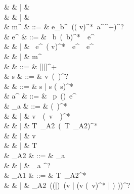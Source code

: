 \documentclass[a4paper]{article}
\begin{document}
{\begin{grammar}
                                    &              & |   & \varepsilon\ \code{\&\&}\ \varepsilon \\
                                    &              & |   & \varepsilon\ \code{||}\ \varepsilon \\
           & m^{}  & ::= & {e_b}^{}\ ((\code{!} v)^*\ {a^{}}^+)^? \\
                   & e^{}  & ::= & \ b\ (\ b)^*\ \ e^{}\\
                                    &              & |   & \ e^{}\ (\code{!} v)^*\ \ e^{}\ \ e^{} \\
                                    &              & |   & m^{} \\
                         & \kappa       & ::= & [||]^+ \\
               & s            & ::= & v\ (\code{:<}\ \kappa)^? \\
              &  & ::= & s | \code{(} s (\code{,}\ s)^*\code{)} \\
                  & a^{}  & ::= & \code{|}\ p\ (\code{=>|->|\textasciitilde>})\ e^{} \\
                     & \tau_a       & ::= & \code{(} \tau (\code{,}\ \tau)^* \code{)} \\
                                    &              & |   & \code{\{} v\ \code{:}\ \tau (\code{,}\ v\ \code{:}\ \tau)^* \code{\}} \\
                                    &              & |   & \code{<} T\ \tau_{A2}\ (\code{|}\ T\ \tau_{A2})^* \code{>} \\
                                    &              & |   & v \\
                                    &              & |   & T \\
                      & \tau_{A2}    & ::= & \code{\#} \tau_a \\
                                    &              & |   & \tau_a \code{!}^? \\
                      & \tau_{A1}    & ::= & T\ \tau_{A2}^* \\
                                    &              & |   & \tau_{A2}\ ((|)\ (v | \code{(} (v (\code{,}\ v)^* | ) \code{)}))^? \\

\end{grammar}}
\end{document}
